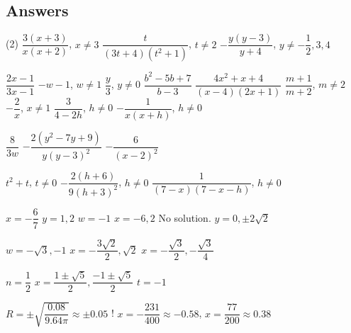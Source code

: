 \clearpage

\subsection{Answers}

\begin{tasks}(2)
\task $\dfrac{3(x+3)}{x(x+2)}$, $x \neq 3$
\task $\dfrac{t}{(3t+4)(t^2+1)}$, $t \neq 2$
\task $-\dfrac{y(y-3)}{y+4}$, $y \neq -\dfrac{1}{2}, 3, 4$ 

\task  $\dfrac{2x-1}{3x-1}$
\task  $-w-1$, $w \neq 1$
\task  $\dfrac{y}{3}$, $y \neq 0$
\task  $\dfrac{b^2-5b+7}{b-3}$
\task  $\dfrac{4x^2+x+4}{(x-4)(2x+1)}$
\task  $\dfrac{m+1}{m+2}$, $m \neq 2$
\task $-\dfrac{2}{x}$, $x \neq 1$
\task $\dfrac{3}{4-2h}$, $h \neq 0$
\task $-\dfrac{1}{x(x+h)}$, $h \neq 0$

\task  $\dfrac{8}{3w}$
\task  $-\dfrac{2(y^2-7y+9)}{y(y-3)^2}$
\task  $-\dfrac{6}{(x-2)^2}$

\task $t^2+t$, $t \neq 0$  
\task $-\dfrac{2(h+6)}{9(h+3)^2}$, $h \neq 0$ 
\task $\dfrac{1}{(7-x)(7-x-h)}$, $h \neq 0$ 


\task $x = -\dfrac{6}{7}$
\task $y = 1, 2$ 
\task $w = -1$ 
\task $x=-6, 2$
\task No solution.
\task $y = 0, \pm 2\sqrt{2}$  


\task $w = -\sqrt{3}, -1$
\task $x = -\dfrac{3\sqrt{2}}{2}, \sqrt{2}$
\task $x = -\dfrac{\sqrt{3}}{2}, -\dfrac{\sqrt{3}}{4}$

\task $n = \dfrac{1}{2}$
\task $x = \dfrac{1 \pm \sqrt{5}}{2}, \dfrac{-1 \pm \sqrt{5}}{2}$
\task $t = -1$


\task $R = \pm \sqrt{\dfrac{0.08}{9.64 \pi}} \approx \pm 0.05$ 
\task! $x = -\dfrac{231}{400} \approx -0.58$, $x = \dfrac{77}{200} \approx 0.38$ 


\end{tasks}
